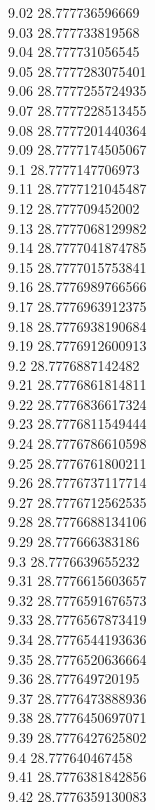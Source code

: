 {9.02	28.777736596669\\
9.03	28.777733819568\\
9.04	28.777731056545\\
9.05	28.7777283075401\\
9.06	28.7777255724935\\
9.07	28.7777228513455\\
9.08	28.7777201440364\\
9.09	28.7777174505067\\
9.1	28.7777147706973\\
9.11	28.7777121045487\\
9.12	28.777709452002\\
9.13	28.7777068129982\\
9.14	28.7777041874785\\
9.15	28.7777015753841\\
9.16	28.7776989766566\\
9.17	28.7776963912375\\
9.18	28.7776938190684\\
9.19	28.7776912600913\\
9.2	28.7776887142482\\
9.21	28.7776861814811\\
9.22	28.7776836617324\\
9.23	28.7776811549444\\
9.24	28.7776786610598\\
9.25	28.7776761800211\\
9.26	28.7776737117714\\
9.27	28.7776712562535\\
9.28	28.7776688134106\\
9.29	28.777666383186\\
9.3	28.7776639655232\\
9.31	28.7776615603657\\
9.32	28.7776591676573\\
9.33	28.7776567873419\\
9.34	28.7776544193636\\
9.35	28.7776520636664\\
9.36	28.777649720195\\
9.37	28.7776473888936\\
9.38	28.7776450697071\\
9.39	28.7776427625802\\
9.4	28.777640467458\\
9.41	28.7776381842856\\
9.42	28.7776359130083\\
}
